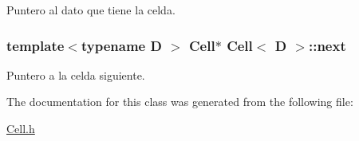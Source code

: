 Puntero al dato que tiene la celda. 

\subsubsection[{\texorpdfstring{next}{next}}]{\setlength{\rightskip}{0pt plus 5cm}template$<$typename D $>$ {\bf Cell}$\ast$ {\bf Cell}$<$ D $>$\+::next}\hypertarget{classCell_a7e0e6c090f8aca70862c2dbc3257e3b9}{}\label{classCell_a7e0e6c090f8aca70862c2dbc3257e3b9}


Puntero a la celda siguiente. 



The documentation for this class was generated from the following file\+:\begin{DoxyCompactItemize}
\item 
\hyperlink{Cell_8h}{Cell.\+h}\end{DoxyCompactItemize}
